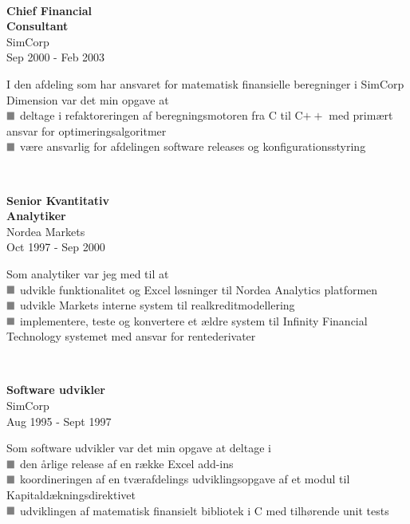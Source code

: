 \documentclass[10pt, a4paper]{article}
\newcommand*{\greysquare}{\textcolor{gray}{\blacksquare}}
\begin{document}
\\[0.5cm]
\begin{Row}%
  \begin{Cell}{1}
    \textbf{Chief Financial \\
    Consultant} \\ [1ex]
    SimCorp \\ 
    Sep 2000 - Feb 2003  
  \end{Cell}
  \begin{Cell}{3}
    I den afdeling som har ansvaret for matematisk finansielle beregninger i SimCorp Dimension var det min opgave at \\ [1ex]
    $\greysquare$ deltage i refaktoreringen af beregningsmotoren fra C til C$++$ med primært ansvar for optimeringsalgoritmer \\
    $\greysquare$ være ansvarlig for afdelingen software releases og konfigurationsstyring
  \end{Cell}
\end{Row}
\\[0.5cm]
\begin{Row}%
  \begin{Cell}{1}
    \textbf{Senior Kvantitativ \\
    Analytiker} \\ [1ex]
    Nordea Markets \\ 
    Oct 1997 - Sep 2000  
  \end{Cell}
  \begin{Cell}{3}
    Som analytiker var jeg med til at \\ [1ex]
    $\greysquare$ udvikle funktionalitet og Excel løsninger til Nordea Analytics platformen \\
    $\greysquare$ udvikle Markets interne system til realkreditmodellering \\
    $\greysquare$ implementere, teste og konvertere et ældre system til Infinity Financial Technology systemet med ansvar for rentederivater
  \end{Cell}
\end{Row}
\\[0.5cm]
\begin{Row}%
  \begin{Cell}{1}
    \textbf{Software udvikler} \\ [1ex]
    SimCorp \\ 
    Aug 1995 - Sept 1997 
  \end{Cell}
  \begin{Cell}{3}
    Som software udvikler var det min opgave at deltage i \\ [1ex]
    $\greysquare$ den årlige release af en række Excel add-ins \\
    $\greysquare$ koordineringen af en tværafdelings udviklingsopgave af et modul til Ka\-pi\-tal\-dæk\-nings\-di\-rek\-ti\-vet \\
    $\greysquare$ udviklingen af matematisk finansielt bibliotek i C med tilhørende unit tests
  \end{Cell}
\end{Row}
\end{document}
